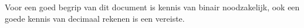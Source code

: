 Voor een goed begrip van dit document is kennis van binair noodzakelijk, ook een goede kennis van decimaal rekenen is een vereiste.
